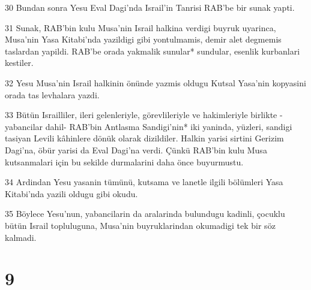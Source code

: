 \par 30 Bundan sonra Yesu Eval Dagi'nda Israil'in Tanrisi RAB'be bir sunak yapti.
\par 31 Sunak, RAB'bin kulu Musa'nin Israil halkina verdigi buyruk uyarinca, Musa'nin Yasa Kitabi'nda yazildigi gibi yontulmamis, demir alet degmemis taslardan yapildi. RAB'be orada yakmalik sunular* sundular, esenlik kurbanlari kestiler.
\par 32 Yesu Musa'nin Israil halkinin önünde yazmis oldugu Kutsal Yasa'nin kopyasini orada tas levhalara yazdi.
\par 33 Bütün Israilliler, ileri gelenleriyle, görevlileriyle ve hakimleriyle birlikte -yabancilar dahil- RAB'bin Antlasma Sandigi'nin* iki yaninda, yüzleri, sandigi tasiyan Levili kâhinlere dönük olarak dizildiler. Halkin yarisi sirtini Gerizim Dagi'na, öbür yarisi da Eval Dagi'na verdi. Çünkü RAB'bin kulu Musa kutsanmalari için bu sekilde durmalarini daha önce buyurmustu.
\par 34 Ardindan Yesu yasanin tümünü, kutsama ve lanetle ilgili bölümleri Yasa Kitabi'nda yazili oldugu gibi okudu.
\par 35 Böylece Yesu'nun, yabancilarin da aralarinda bulundugu kadinli, çocuklu bütün Israil topluluguna, Musa'nin buyruklarindan okumadigi tek bir söz kalmadi.

\chapter{9}

